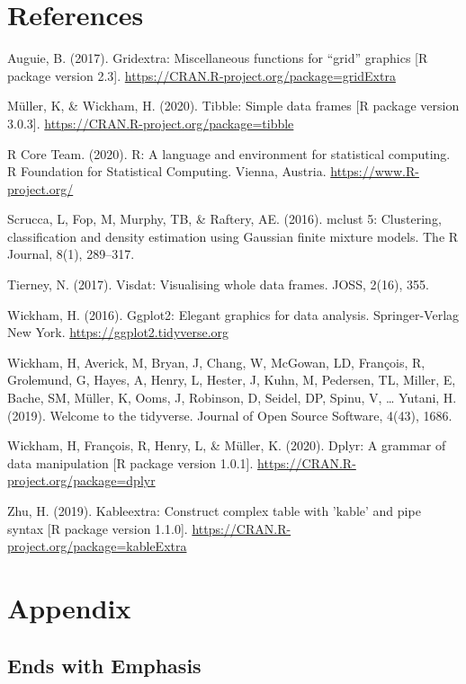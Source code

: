 \documentclass[11pt,a4paper,]{article}
\begin{document}
\clearpage

\hypertarget{references}{%
\section{References}\label{references}}

Auguie, B. (2017). Gridextra: Miscellaneous functions for ``grid'' graphics {[}R package version 2.3{]}.
\url{https://CRAN.R-project.org/package=gridExtra}

Müller, K, \& Wickham, H. (2020). Tibble: Simple data frames {[}R package version 3.0.3{]}. \url{https://CRAN.R-project.org/package=tibble}

R Core Team. (2020). R: A language and environment for statistical computing. R Foundation for Statistical Computing. Vienna, Austria. \url{https://www.R-project.org/}

Scrucca, L, Fop, M, Murphy, TB, \& Raftery, AE. (2016). mclust 5: Clustering, classification and density
estimation using Gaussian finite mixture models. The R Journal, 8(1), 289--317.

Tierney, N. (2017). Visdat: Visualising whole data frames. JOSS, 2(16), 355.

Wickham, H. (2016). Ggplot2: Elegant graphics for data analysis. Springer-Verlag New York. \url{https://ggplot2.tidyverse.org}

Wickham, H, Averick, M, Bryan, J, Chang, W, McGowan, LD, François, R, Grolemund, G, Hayes, A,
Henry, L, Hester, J, Kuhn, M, Pedersen, TL, Miller, E, Bache, SM, Müller, K, Ooms, J, Robinson,
D, Seidel, DP, Spinu, V, \ldots{} Yutani, H. (2019). Welcome to the tidyverse. Journal of Open
Source Software, 4(43), 1686.

Wickham, H, François, R, Henry, L, \& Müller, K. (2020). Dplyr: A grammar of data manipulation {[}R
package version 1.0.1{]}. \url{https://CRAN.R-project.org/package=dplyr}

Zhu, H. (2019). Kableextra: Construct complex table with 'kable' and pipe syntax {[}R package version
1.1.0{]}. \url{https://CRAN.R-project.org/package=kableExtra}

\clearpage

\appendix

\hypertarget{appendix}{%
\section{Appendix}\label{appendix}}

\hypertarget{ends-with-emphasis}{%
\subsection{Ends with Emphasis}\label{ends-with-emphasis}}
\end{document}
